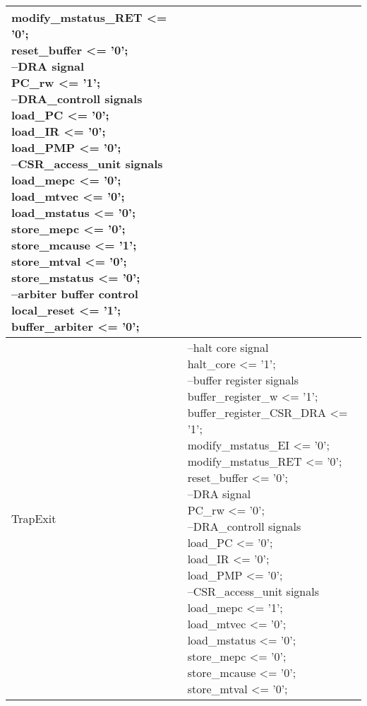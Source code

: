 \begin{small}
\begin{longtable}{| p{} | p{} |}
{		modify\_mstatus\_RET <= '0';\\
		reset\_buffer <= '0';\\
		--DRA signal\\
		PC\_rw <= '1';\\
		--DRA\_controll signals\\
		load\_PC <= '0';\\
		load\_IR <= '0';\\
		load\_PMP <= '0';\\
		--CSR\_access\_unit signals\\
		load\_mepc <= '0';\\
		load\_mtvec <= '0';\\
		load\_mstatus <= '0';\\
		store\_mepc <= '0';\\
		store\_mcause <= '1';\\
		store\_mtval <= '0';\\
		store\_mstatus <= '0';\\
		--arbiter buffer control\\
		local\_reset <= '1';\\
		buffer\_arbiter <= '0';} \\
	\hline
	TrapExit & \makecell{--halt core signal\\
		halt\_core <= '1';\\
		--buffer register signals\\
		buffer\_register\_w <= '1';\\
		buffer\_register\_CSR\_DRA <= '1';\\
		modify\_mstatus\_EI <= '0';\\
		modify\_mstatus\_RET <= '0';\\
		reset\_buffer <= '0';\\
		--DRA signal\\
		PC\_rw <= '0';\\
		--DRA\_controll signals\\
		load\_PC <= '0';\\
		load\_IR <= '0';\\
		load\_PMP <= '0';\\
		--CSR\_access\_unit signals\\
		load\_mepc <= '1';\\
		load\_mtvec <= '0';\\
		load\_mstatus <= '0';\\
		store\_mepc <= '0';\\
		store\_mcause <= '0';\\
		store\_mtval <= '0';\\
}
\end{longtable}
\end{small}
